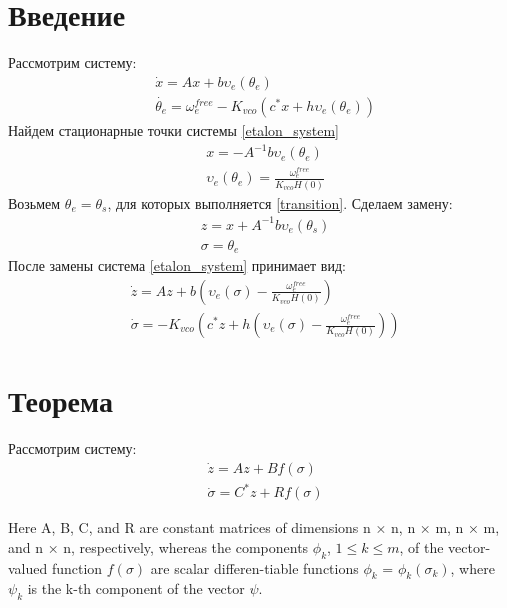\documentclass[a4paper,14pt]{extarticle} %
\begin{document}
\section{Введение}
Рассмотрим систему:
 \begin{equation}\label{etalon_system}
 \begin{aligned}
 &\dot{x} = Ax + b\upsilon_e(\theta_e)\\
 &\dot{\theta_e} = \omega_e^{free} - K_{vco}(c^*x + h\upsilon_e(\theta_e))
 \end{aligned}
\end{equation}
Найдем стационарные точки системы \eqref{etalon_system}
 \begin{equation}\label{transition}
 \begin{aligned}
 &x = -A^{-1}b\upsilon_e(\theta_e)\\
 &\upsilon_e(\theta_e) = \frac{\omega_e^{free}}{K_{vco}H(0)}
 \end{aligned}
\end{equation}
Возьмем $\theta_e = \theta_s$, для которых выполняется \eqref{transition}. Сделаем замену:
 \begin{equation}\label{replacement1}
 \begin{aligned}
 &z =x + A^{-1}b\upsilon_e(\theta_s)\\
 &\sigma = \theta_e 
 \end{aligned}
\end{equation}
После замены система \eqref{etalon_system} принимает вид:
 \begin{equation}
 \begin{aligned}
 &\dot{z} = Az + b(\upsilon_e(\sigma) - \frac{\omega_e^{free}}{K_{vco}H(0)})\\
 &\dot{\sigma} = -K_{vco}(c^*z + h(\upsilon_e(\sigma) - \frac{\omega_e^{free}}{K_{vco}H(0)}))
 \end{aligned}
\end{equation}

\section{Теорема}
Рассмотрим систему:
 \begin{equation}\label{system}
 \begin{aligned}
 &\dot{z} = Az + Bf(\sigma)\\
 &\dot{\sigma} = C^*z + Rf(\sigma)
 \end{aligned}
\end{equation}

Here A, B, C, and R are constant matrices of dimensions n × n, n × m, n × m, and n × n, respectively, whereas the components $\phi_k$, $1 \leq  k \leq m$, of the vector-valued function $f(\sigma)$ are scalar differen-tiable functions $\phi_k$ = $\phi_k(\sigma_k)$, where $\psi_k$ is the k-th component of the vector $\psi$.\\
\end{document}
